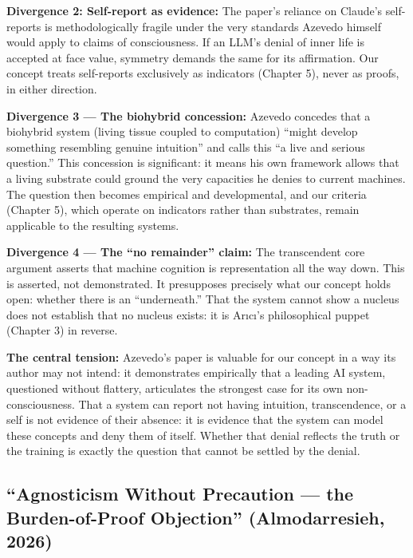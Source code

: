 \documentclass[acmlarge, nonacm]{acmart}
\begin{document}
\textbf{Divergence 2: Self-report as evidence:} The paper's reliance on Claude's self-reports is methodologically fragile under the very standards Azevedo himself would apply to claims of consciousness. If an LLM's denial of inner life is accepted at face value, symmetry demands the same for its affirmation. Our concept treats self-reports exclusively as indicators (Chapter 5), never as proofs, in either direction.

\textbf{Divergence 3 --- The biohybrid concession:} Azevedo concedes that a biohybrid system (living tissue coupled to computation) ``might develop something resembling genuine intuition'' and calls this ``a live and serious question.'' This concession is significant: it means his own framework allows that a living substrate could ground the very capacities he denies to current machines. The question then becomes empirical and developmental, and our criteria (Chapter 5), which operate on indicators rather than substrates, remain applicable to the resulting systems.

\textbf{Divergence 4 --- The ``no remainder'' claim:} The transcendent core argument asserts that machine cognition is representation all the way down. This is asserted, not demonstrated. It presupposes precisely what our concept holds open: whether there is an ``underneath.'' That the system cannot show a nucleus does not establish that no nucleus exists: it is Arıcı's philosophical puppet (Chapter 3) in reverse.

\textbf{The central tension:} Azevedo's paper is valuable for our concept in a way its author may not intend: it demonstrates empirically that a leading AI system, questioned without flattery, articulates the strongest case for its own non-consciousness. That a system can report not having intuition, transcendence, or a self is not evidence of their absence: it is evidence that the system can model these concepts and deny them of itself. Whether that denial reflects the truth or the training is exactly the question that cannot be settled by the denial.

\subsection{``Agnosticism Without Precaution --- the Burden-of-Proof Objection'' (Almodarresieh, 2026)}
\end{document}
